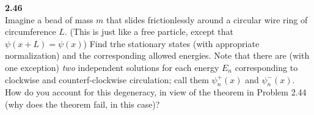 \documentclass[fleqn]{article}
\begin{document}
  \textbf{2.46}
  \\
  Imagine a bead of mass $m$ that slides frictionlessly around a circular wire ring of circumference $L$. 
  (This is just like a free particle, except that $\psi(x+L)=\psi(x)$) Find trhe stationary states (with
  appropriate normalization) and the corresponding allowed energies. Note that there are (with one exception)
  \emph{two} independent solutions for each energy $E_n$ corresponding to clockwise and counterf-clockwise
  circulation; call them $\psi^+_n(x)$ and $\psi^-_n(x)$. How do you account for this degeneracy, in
  view of the theorem in Problem 2.44 (why does the theorem fail, in this case)?
\end{document}
